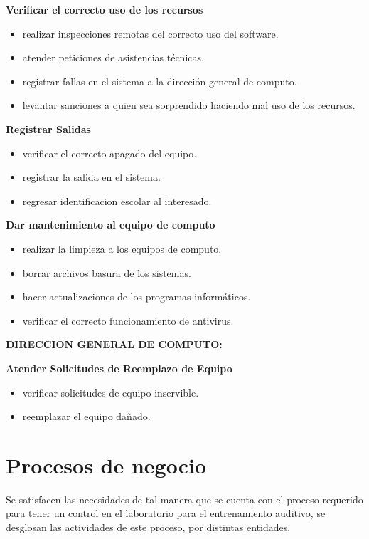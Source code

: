 \documentclass[spanish,12pt,letterpapper]{article}
\begin{document}
	\textbf{Verificar el correcto uso de los recursos}
	\begin{itemize}
	\item realizar inspecciones remotas del correcto uso del software.
	\item atender peticiones de asistencias técnicas. 
	\item registrar fallas en el sistema a la dirección general de computo.
	\item levantar sanciones a quien sea sorprendido haciendo mal uso de los recursos.\\
	\end{itemize}
	
	\textbf{Registrar Salidas}
	\begin{itemize}
	\item verificar el correcto apagado del equipo.
	\item registrar la salida en el sistema.
	\item regresar identificacion escolar al interesado.\\
	\end{itemize}
	
	
	\textbf{Dar mantenimiento al equipo de computo}
	\begin{itemize}
	\item realizar la limpieza a los equipos de computo.
	\item borrar archivos basura de los sistemas.
	\item hacer actualizaciones de los programas informáticos.
	\item verificar el correcto funcionamiento de antivirus.\\
	\end{itemize}
	
	\textbf{DIRECCION GENERAL DE COMPUTO:\\}
	
	\textbf{Atender Solicitudes de Reemplazo de Equipo}
	\begin{itemize}
	\item verificar solicitudes de equipo inservible.
	\item reemplazar el equipo dañado.
	\end{itemize}
	
	\section{Procesos de negocio}
	Se satisfacen las necesidades de tal manera que se cuenta con el proceso requerido para tener un control en el laboratorio para el entrenamiento auditivo, se desglosan las actividades de este proceso, por distintas entidades.
	
\end{document}
